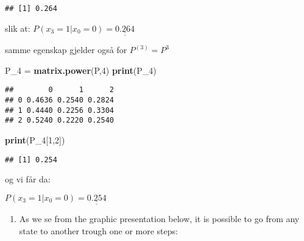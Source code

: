 \documentclass[]{article}
\newenvironment{Shaded}{\begin{snugshade}}{\end{snugshade}}
\newcommand{\DataTypeTok}[1]{\textcolor[rgb]{0.13,0.29,0.53}{#1}}
\newcommand{\DecValTok}[1]{\textcolor[rgb]{0.00,0.00,0.81}{#1}}
\newcommand{\FloatTok}[1]{\textcolor[rgb]{0.00,0.00,0.81}{#1}}
\newcommand{\KeywordTok}[1]{\textcolor[rgb]{0.13,0.29,0.53}{\textbf{#1}}}
\newcommand{\NormalTok}[1]{#1}
\newcommand{\OperatorTok}[1]{\textcolor[rgb]{0.81,0.36,0.00}{\textbf{#1}}}
\newcommand{\OtherTok}[1]{\textcolor[rgb]{0.56,0.35,0.01}{#1}}
\newcommand{\StringTok}[1]{\textcolor[rgb]{0.31,0.60,0.02}{#1}}
\providecommand{\tightlist}{%
  \setlength{\itemsep}{0pt}\setlength{\parskip}{0pt}}
\begin{document}
\begin{verbatim}
## [1] 0.264
\end{verbatim}

slik at: \(P(x_{3}=1|x_{0}=0) = \underline{\underline{0.264}}\)

samme egenskap gjelder også for \(P^{(3)}=P^{3}\)

\begin{Shaded}
\begin{Highlighting}[]
\NormalTok{P_}\DecValTok{4}\NormalTok{ =}\StringTok{ }\KeywordTok{matrix.power}\NormalTok{(P,}\DecValTok{4}\NormalTok{)}
\KeywordTok{print}\NormalTok{(P_}\DecValTok{4}\NormalTok{)}
\end{Highlighting}
\end{Shaded}

\begin{verbatim}
##        0      1      2
## 0 0.4636 0.2540 0.2824
## 1 0.4440 0.2256 0.3304
## 2 0.5240 0.2220 0.2540
\end{verbatim}

\begin{Shaded}
\begin{Highlighting}[]
\KeywordTok{print}\NormalTok{(P_}\DecValTok{4}\NormalTok{[}\DecValTok{1}\NormalTok{,}\DecValTok{2}\NormalTok{])}
\end{Highlighting}
\end{Shaded}

\begin{verbatim}
## [1] 0.254
\end{verbatim}

og vi får da:

\(P(x_{3}=1|x_{0}=0) = \underline{\underline{0.254}}\)

\begin{enumerate}
\def\labelenumi{\alph{enumi})}
\setcounter{enumi}{1}
\tightlist
\item
  As we se from the graphic presentation below, it is possible to go
  from any state to another trough one or more steps:
\end{enumerate}

\begin{Shaded}
\end{Shaded}
\end{document}
